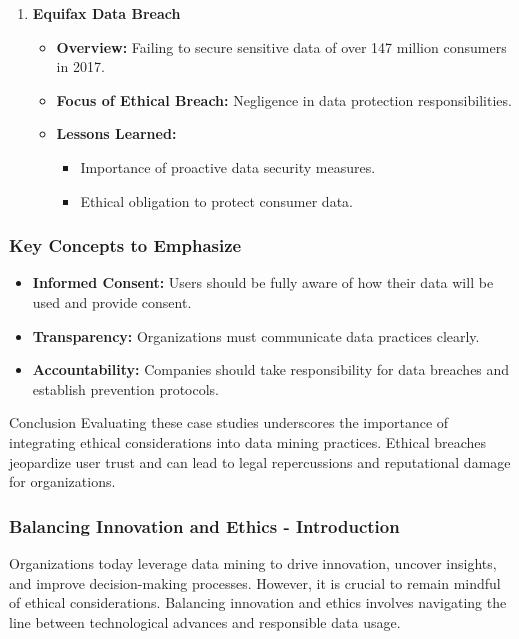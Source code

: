 \documentclass{beamer}
\begin{document}
\begin{frame}[fragile]
\begin{enumerate}
        \item \textbf{Equifax Data Breach}
            \begin{itemize}
                \item \textbf{Overview:} Failing to secure sensitive data of over 147 million consumers in 2017.
                \item \textbf{Focus of Ethical Breach:} Negligence in data protection responsibilities.
                \item \textbf{Lessons Learned:}
                    \begin{itemize}
                        \item Importance of proactive data security measures.
                        \item Ethical obligation to protect consumer data.
                    \end{itemize}
            \end{itemize}
    \end{enumerate}
\end{frame}

\begin{frame}[fragile]
    \frametitle{Key Concepts to Emphasize}
    \begin{itemize}
        \item \textbf{Informed Consent:} Users should be fully aware of how their data will be used and provide consent.
        \item \textbf{Transparency:} Organizations must communicate data practices clearly.
        \item \textbf{Accountability:} Companies should take responsibility for data breaches and establish prevention protocols.
    \end{itemize}
    
    \begin{block}{Conclusion}
        Evaluating these case studies underscores the importance of integrating ethical considerations into data mining practices. Ethical breaches jeopardize user trust and can lead to legal repercussions and reputational damage for organizations.
    \end{block}
\end{frame}

\begin{frame}[fragile]
    \frametitle{Balancing Innovation and Ethics - Introduction}
    Organizations today leverage data mining to drive innovation, uncover insights, and improve decision-making processes. 
    However, it is crucial to remain mindful of ethical considerations. Balancing innovation and ethics involves navigating the line between technological advances and responsible data usage.
\end{frame}
\end{document}
